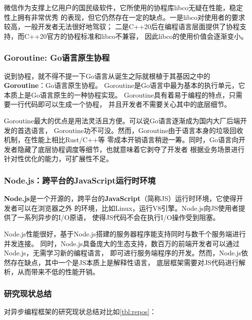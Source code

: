\documentclass[supercite]{HustGraduPaper}
\newcommand{\rtbl}[1]{\autoref{tbl:#1}}
\theoremstyle{definition}
\begin{document}
微信\cite{montag2018multipurpose}作为支撑上亿用户的国民级软件，它所使用的协程库libco无疑在性能，稳定性上拥有非常优秀
的表现，但它仍然存在一定的缺点。一是libco对使用者的要求较高，一般开发者无法很好地驾驭；
二是C++20后在编程语言层面提供了协程支持\cite{belson2020c++}，而C++20官方的协程标准和libco不兼容，
因此libco的使用价值会逐渐变小。\par

\subsubsection{Goroutine: Go语言原生协程}
说到协程，就不得不提一下Go语言\cite{meyerson2014go}从诞生之际就根植于其基因之中的\textbf{Goroutine}：Go语言原生协程\cite{prabhakar2011concurrent}。
Goroutine是Go语言中最为基本的执行单元，它本质上是Go语言原生的一种协程实现。
Goroutine具有着易于编程的特点，只需要一行代码即可以生成一个协程，
并且开发者不需要关心其中的底层细节。\par

Goroutine最大的优点是用法灵活且方便。可以说Go语言逐渐成为国内大厂后端开发的首选语言，
Goroutine功不可没。然而，Goroutine由于语言本身的垃圾回收机制\cite{sibiryov2017golang}，在性能上相比Rust/C++等
零成本开销语言稍逊一筹\cite{keskiniemi2022measuring}。同时，Go语言向开发者隐藏了底层协程调度等细节，也就意味着它剥夺了开发者
根据业务场景进行针对性优化的能力，可扩展性不足。\par

\subsubsection{Node.js：跨平台的JavaScript运行时环境}
\textbf{Node.js}\cite{tilkov2010node}是一个开源的，跨平台的\textbf{JavaScript}\cite{crockford2008javascript}（简称JS）运行时环境，它使得开发者可以在浏览器之外
的环境，比如Linux，运行V8引擎。Node.js向JS使用者提供了一系列异步的I/O原语，
使得JS代码不会在执行I/O操作受到阻塞。\par

Node.js性能很好，基于Node.js搭建的服务器程序能支持同时与数千个服务端进行并发连接。
同时，Node.js具备庞大的生态支持，数百万的前端开发者可以通过Node.js，无需学习新的编程语言，
即可进行服务端程序的开发。然而，Node.js依然存在缺点，其中一个是JS本质上是解释性语言，
底层框架需要对JS代码进行解析，从而带来不低的性能开销。\par

\subsubsection{研究现状总结}
对异步编程框架的研究现状总结对比如\rtbl{repos}：
\end{document}
